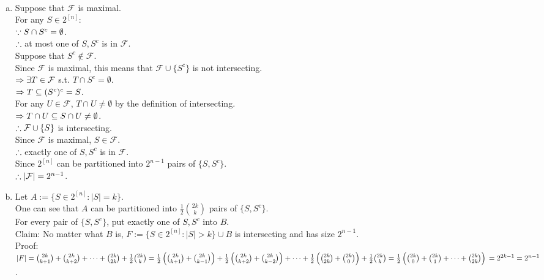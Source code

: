 \setcounter{pr}{0}

\begin{pr}$ $
\begin{enumerate}[(a)]
\item Suppose that $\mathcal F$ is maximal.\\
For any $S\in2^{[n]}$:\\
$\because S\cap S^c=\emptyset$.\\
$\therefore$ at most one of $S, S^c$ is in $\mathcal F$.\\
Suppose that $S^c\notin\mathcal F$.\\
Since $\mathcal F$ is maximal, this means that $\mathcal F\cup\{S^c\}$ is not intersecting.\\
$\Rightarrow\exists T\in\mathcal F$ s.t. $T\cap S^c=\emptyset$.\\
$\Rightarrow T\subseteq(S^c)^c=S$.\\
For any $U\in\mathcal F$, $T\cap U\neq\emptyset$ by the definition of intersecting.\\
$\Rightarrow T\cap U\subseteq S\cap U\neq\emptyset$.\\
$\therefore\mathcal F\cup\{S\}$ is intersecting.\\
Since $\mathcal F$ is maximal, $S\in\mathcal F$.\\
$\therefore$ exactly one of $S, S^c$ is in $\mathcal F$.\\
Since $2^{[n]}$ can be partitioned into $2^{n-1}$ pairs of $\{S, S^c\}$.\\
$\therefore|\mathcal F|=2^{n-1}$.
\item Let $A:=\{S\in2^{[n]}:|S|=k\}$.\\
One can see that $A$ can be partitioned into $\frac12\binom{2k}k$ pairs of $\{S, S^c\}$.\\
For every pair of $\{S, S^c\}$, put exactly one of $S, S^c$ into $B$.\\
Claim: No matter what $B$ is, $F:=\{S\in2^{[n]}:|S|>k\}\cup B$ is intersecting and has size $2^{n-1}$.\\
Proof:\\
$|F|=\binom{2k}{k+1}+\binom{2k}{k+2}+\cdots+\binom{2k}{2k}+\frac12\binom{2k}k\\
=\frac12\left(\binom{2k}{k+1}+\binom{2k}{k-1}\right)+\frac12\left(\binom{2k}{k+2}+\binom{2k}{k-2}\right)+\cdots+\frac12\left(\binom{2k}{2k}+\binom{2k}0\right)+\frac12\binom{2k}k\\
=\frac12\left(\binom{2k}0+\binom{2k}1+\cdots+\binom{2k}{2k}\right)\\
=2^{2k-1}=2^{n-1}$.\\

\end{enumerate}
\end{pr}
